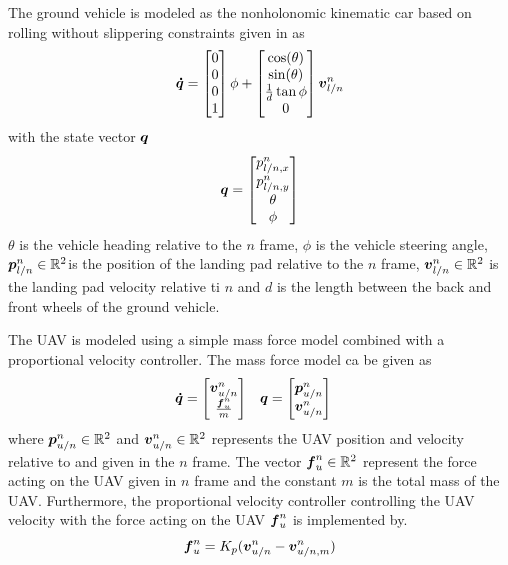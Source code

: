 The ground vehicle is modeled as the nonholonomic kinematic car based on rolling without slippering constraints given in \cite{spong2006robot} as
\begin{equation}
  \boldsymbol{\dot{q}}
  =
  \begin{bmatrix}
    0\\
    0\\
    0\\
    1
  \end{bmatrix}
  \phi
  +
  \begin{bmatrix}
    \cos(\theta)\\
    \sin(\theta)\\
    \frac{1}{d}\tan{\phi}\\
    0
  \end{bmatrix}
  \boldsymbol{v}^{n}_{l/n}
\end{equation}
with the state vector $\boldsymbol{q}$
\begin{equation}
  \boldsymbol{q}=
  \begin{bmatrix}
    p^n_{l/n,x}\\
    p^n_{l/n,y}\\
    \theta\\
    \phi
  \end{bmatrix}
\end{equation}
$\theta$ is the vehicle heading relative to the $n$ frame, $\phi$ is the vehicle steering angle, $\boldsymbol{p}^n_{l/n}\in\mathbb{R}^{2}$is the position of the landing pad relative to the $n$ frame, $\boldsymbol{v}^n_{l/n}\in\mathbb{R}^{2}$ is the landing pad velocity relative ti $n$ and $d$ is the length between the back and front wheels of the ground vehicle.

The UAV is modeled using a simple mass force model combined with a proportional velocity controller. The mass force model ca be given as
\begin{align}
  \boldsymbol{\dot{q}}&=
  \begin{bmatrix}
    \boldsymbol{v}^n_{u/n}\\
    \frac{\boldsymbol{f}_u^n}{m}
  \end{bmatrix}
  &
  \boldsymbol{q}&=
  \begin{bmatrix}
    \boldsymbol{p}^n_{u/n}\\
    \boldsymbol{v}^n_{u/n}
  \end{bmatrix}
\end{align}
where $\boldsymbol{p}^n_{u/n}\in\mathbb{R}^{2}$ and $\boldsymbol{v}^n_{u/n}\in\mathbb{R}^{2}$ represents the \gls{UAV} position and velocity relative to and given in the $n$ frame. The vector $\boldsymbol{f}_u^n\in\mathbb{R}^{2}$ represent the force acting on the UAV given in $n$ frame and the constant $m$ is the total mass of the \gls{UAV}. Furthermore, the proportional velocity controller controlling the \gls{UAV} velocity with the force acting on the \gls{UAV} $\boldsymbol{f}_u^n$ is implemented by.
\begin{equation}
  \boldsymbol{f}_u^n=K_p(\boldsymbol{v}^n_{u/n}-\boldsymbol{v}^n_{u/n,m})
\end{equation}


